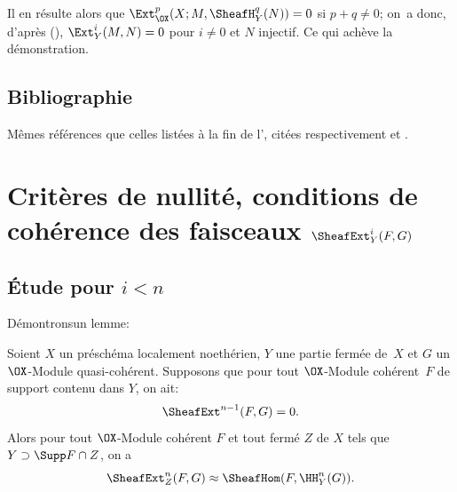 Il en r\'esulte alors que $\Ext_{\OX}^p(X;M, \SheafH_Y^q(N))=0$ si $p+q \neq 0$; on~a donc, d'apr\`es (), $\Ext_Y^i(M, N)=0$ pour $i\neq 0$ et $N$ injectif. Ce qui ach\`eve la d\'emonstration.

\section*{Bibliographie} M\^emes r\'ef\'erences que celles list\'ees \`a la fin de l'\Exp {}, cit\'ees respectivement  et .

\chapter[Crit\`eres de nullit\'e, conditions de coh\'erence]
{Crit\`eres de nullit\'e, conditions de coh\'erence des faisceaux $\SheafExt^{i}_{Y}(F, G)$}\label{VII}

\renewcommand{\theequation}{\thesection.\arabic{equation}}

\section{\'Etude pour $i < n$}

D\'emontrons\pageoriginale un lemme:

\begin{lemme} \label{VII.1.1}
Soient $X$ un pr\'esch\'ema localement noeth\'erien, $Y$ une partie ferm\'ee de~$X$ et $G$ un $\OX$-Module quasi-coh\'erent. Supposons que pour tout $\OX$-Module coh\'erent~$F$ de support contenu dans $Y$, on ait:
\[
\SheafExt^{n-1}(F, G) = 0.
\]
Alors pour tout $\OX$-Module coh\'erent $F$ et tout ferm\'e $Z$ de $X$ tels que $Y \supset \Supp F \cap Z$, on a
\[
\SheafExt^n_Z(F, G) \approx \SheafHom (F, \HH^n_Y(G)).
\]
\end{lemme}

